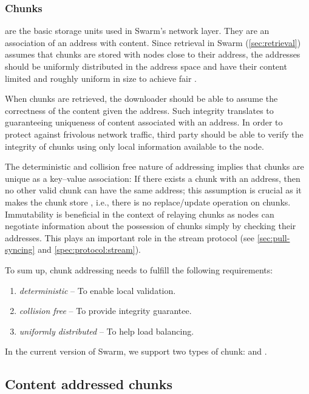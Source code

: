 \subsubsection{Chunks}\label{sec:chunks}

 are the basic storage units used in Swarm's network layer. They are an association of an address with content. Since retrieval in Swarm (\ref{sec:retrieval}) assumes that chunks are stored with nodes close to their address,  the addresses should be uniformly distributed in the address space and have their content limited and roughly uniform in size to achieve fair .  

When chunks are retrieved, the downloader should be able to assume the correctness of the content given the address. Such integrity translates to guaranteeing uniqueness of content associated with an address. In order to protect against frivolous network traffic, third party  should be able to verify the integrity of chunks using only local information available to the node.

The deterministic and collision free nature of addressing implies that chunks are unique as a key--value association: If there exists a chunk with an address, then no other valid chunk can have the same address; this assumption is crucial as it makes the chunk store , i.e., there is no replace/update operation on chunks. Immutability is beneficial in the context of relaying chunks as nodes can negotiate information about the possession of chunks simply by checking their addresses. This plays an important role in the stream protocol (see \ref{sec:pull-syncing} and \ref{spec:protocol:stream}).

To sum up, chunk addressing needs to fulfill the following requirements:

\begin{enumerate}
    \item \emph{deterministic} -- To enable local validation.
    \item \emph{collision free} -- To provide integrity guarantee.
    \item \emph{uniformly distributed} -- To help load balancing.
\end{enumerate}

In the current version of Swarm, we support two types of chunk:  and . 

\subsection{Content addressed  chunks}\label{sec:content-addressed-chunks}

